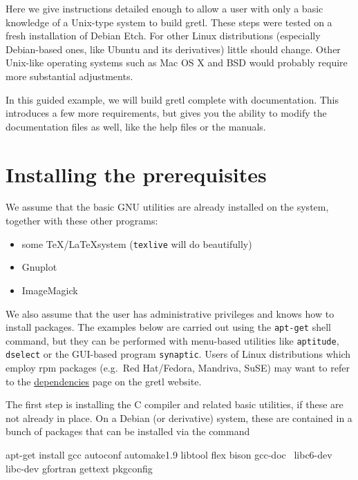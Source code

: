 Here we give instructions detailed enough to allow a user
with only a basic knowledge of a Unix-type system to build gretl.
These steps were tested on a fresh installation of Debian Etch. For
other Linux distributions (especially Debian-based ones, like Ubuntu
and its derivatives) little should change. Other Unix-like operating
systems such as Mac OS X and BSD would probably require more substantial
adjustments.

In this guided example, we will build gretl complete with
documentation.  This introduces a few more requirements, but gives you
the ability to modify the documentation files as well, like the help
files or the manuals.

\section{Installing the prerequisites}

We assume that the basic GNU utilities are already installed on the
system, together with these other programs:
\begin{itemize}
\item some \TeX/\LaTeX system (\texttt{texlive} will do beautifully)
\item Gnuplot
\item ImageMagick
\end{itemize}
We also assume that the user has administrative privileges and knows
how to install packages.  The examples below are carried out using the
\texttt{apt-get} shell command, but they can be performed with
menu-based utilities like \texttt{aptitude}, \texttt{dselect} or the
GUI-based program \texttt{synaptic}. Users of Linux distributions
which employ rpm packages (e.g.\ Red Hat/Fedora, Mandriva, SuSE) may
want to refer to the
\href{http://gretl.sourceforge.net/depend.html}{dependencies} page on
the gretl website.

The first step is installing the C compiler and related basic
utilities, if these are not already in place. On a Debian (or
derivative) system, these are contained in a bunch of packages that
can be installed via the command
\begin{code}
apt-get install gcc autoconf automake1.9 libtool flex bison gcc-doc \
libc6-dev libc-dev gfortran gettext pkgconfig
\end{code}

